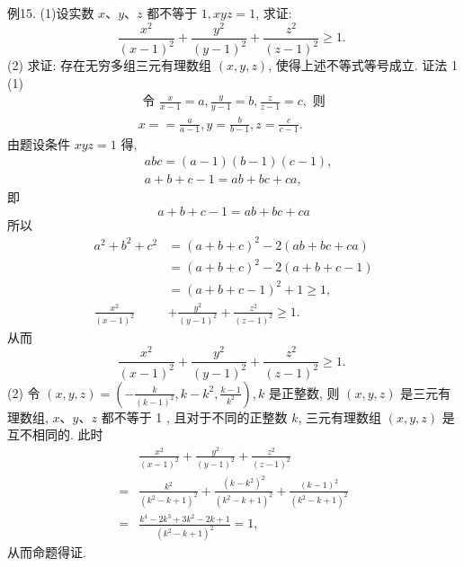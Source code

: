 例15. (1)设实数 $x 、 y 、 z$ 都不等于 $1, x y z=1$, 求证:
$$
\frac{x^2}{(x-1)^2}+\frac{y^2}{(y-1)^2}+\frac{z^2}{(z-1)^2} \geqslant 1 \text {. }
$$
(2) 求证: 存在无穷多组三元有理数组 $(x, y, z)$, 使得上述不等式等号成立.
证法 1 (1)
$$
\begin{gathered}
\text { 令 } \frac{x}{x-1}=a, \frac{y}{y-1}=b, \frac{z}{z-1}=c, \text { 则 } \\
x==\frac{a}{a-1}, y=\frac{b}{b-1}, z=\frac{c}{c-1} .
\end{gathered}
$$
由题设条件 $x y z=1$ 得,
$$
\begin{aligned}
& a b c=(a-1)(b-1)(c-1), \\
& a+b+c-1=a b+b c+c a,
\end{aligned}
$$
即
$$
a+b+c-1=a b+b c+c a
$$
所以
$$
\begin{aligned}
a^2+b^2+c^2 & =(a+b+c)^2-2(a b+b c+c a) \\
& =(a+b+c)^2-2(a+b+c-1) \\
& =(a+b+c-1)^2+1 \geqslant 1, \\
\frac{x^2}{(x-1)^2} & +\frac{y^2}{(y-1)^2}+\frac{z^2}{(z-1)^2} \geqslant 1 .
\end{aligned}
$$
从而
$$
\frac{x^2}{(x-1)^2}+\frac{y^2}{(y-1)^2}+\frac{z^2}{(z-1)^2} \geqslant 1 \text {. }
$$
(2) 令 $(x, y, z)=\left(-\frac{k}{(k-1)^2}, k-k^2, \frac{k-1}{k^2}\right), k$ 是正整数, 则 $(x, y, z)$ 是三元有理数组, $x 、 y 、 z$ 都不等于 1 , 且对于不同的正整数 $k$, 三元有理数组 $(x, y, z)$ 是互不相同的.
此时
$$
\begin{aligned}
& \frac{x^2}{(x-1)^2}+\frac{y^2}{(y-1)^2}+\frac{z^2}{(z-1)^2} \\
= & \frac{k^2}{\left(k^2-k+1\right)^2}+\frac{\left(k-k^2\right)^2}{\left(k^2-k+1\right)^2}+\frac{(k-1)^2}{\left(k^2-k+1\right)^2} \\
= & \frac{k^4-2 k^3+3 k^2-2 k+1}{\left(k^2-k+1\right)^2}=1,
\end{aligned}
$$
从而命题得证.



